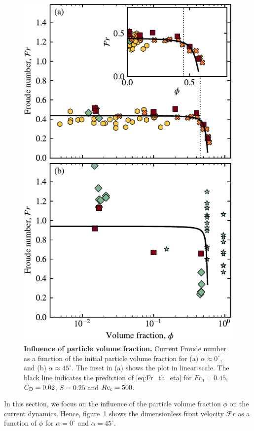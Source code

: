 \documentclass[12pt]{article}
\begin{document}
\begin{figure}
	\centering
	\includegraphics{figure6.pdf}
	\caption{\textbf{Influence of particle volume fraction.} Current Froude number as a function of the initial particle volume fraction for (a) $\alpha \approx 0^\circ$, and (b) $\alpha \approx 45^\circ$. The inset in (a) shows the plot in linear scale. The black line indicates the prediction of \eqref{eq:Fr_th_eta} for $Fr_{0} = 0.45$, $C_{\text D} = 0.02$, $S = 0.25$ and $Re_{\text c} = 500$.}
	\label{fig:fig6}
\end{figure}

In this section, we focus on the influence of the particle volume fraction $\phi$ on the current dynamics. Hence, figure~\ref{fig:fig6} shows the dimensionless front velocity $\mathcal{F}r$ as a function of $\phi$ for $\alpha=0^\circ$ and $\alpha=45^\circ$.
\end{document}
